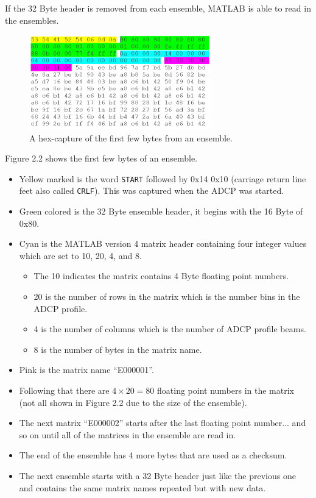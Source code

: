 If the 32 Byte header is removed from each ensemble, MATLAB is able to read in the ensembles.
\begin{figure}[h]
\centering
      \includegraphics[width=0.7\textwidth]{hexdump}
        \caption{A hex-capture of the first few bytes from an ensemble.}
\end{figure}
Figure 2.2 shows the first few bytes of an ensemble.
\begin{itemize}
\item Yellow marked is the word \texttt{START} followed by 0x14 0x10 (carriage return line feet also called \texttt{CRLF}). This was captured when the ADCP was started.
\item Green colored is the 32 Byte ensemble header, it begins with the 16 Byte of 0x80.
\item Cyan is the MATLAB version 4 matrix header containing four integer values which are set to 10, 20, 4, and 8.  
\begin{itemize}
\item The 10 indicates the matrix contains 4 Byte floating point numbers. 
\item 20 is the number of rows in the matrix which is the number bins in the ADCP profile. 
\item 4 is the number of columns which is the number of ADCP profile beams.  
\item 8 is the number of bytes in the matrix name.  
\end{itemize}
\item Pink is the matrix name ``E000001''.
\item Following that there are $4 \times 20 = 80$  floating point numbers in the matrix (not all shown in Figure 2.2 due to the size of the ensemble).
\item The next matrix ``E000002'' starts after the last floating point number... and so on until all of the matrices in the ensemble are read in.
\item The end of the ensemble has 4 more bytes that are used as a checksum. 
\item The next ensemble starts with a 32 Byte header just like the previous one and contains the same matrix names repeated but with new data. 
\end{itemize}

